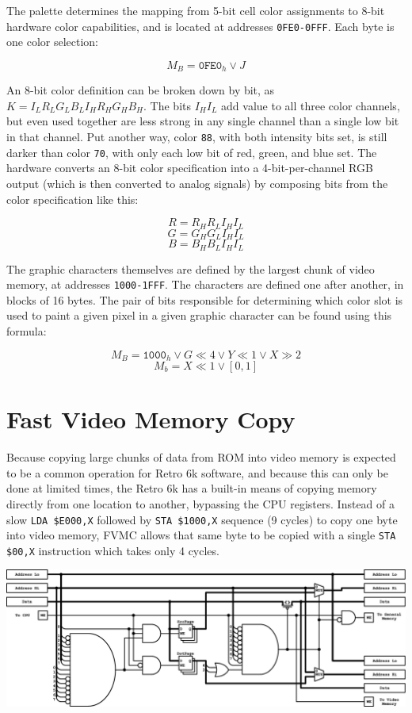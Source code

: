 \documentclass[12pt]{{memoir}}
\begin{document}
The palette determines the mapping from 5-bit cell color assignments to 8-bit hardware color capabilities, and is located at addresses \texttt{0FE0-0FFF}. Each byte is one color selection:

$$M_B = \texttt{0FE0}_h \vee J$$

An 8-bit color definition can be broken down by bit, as $K = I_LR_LG_LB_LI_HR_HG_HB_H$. The bits $I_HI_L$ add value to all three color channels, but even used together are less strong in any single channel than a single low bit in that channel. Put another way, color \texttt{88}, with both intensity bits set, is still darker than color \texttt{70}, with only each low bit of red, green, and blue set. The hardware converts an 8-bit color specification into a 4-bit-per-channel RGB output (which is then converted to analog signals) by composing bits from the color specification like this:

$$R = R_HR_LI_HI_L$$
$$G = G_HG_LI_HI_L$$
$$B = B_HB_LI_HI_L$$

The graphic characters themselves are defined by the largest chunk of video memory, at addresses \texttt{1000-1FFF}. The characters are defined one after another, in blocks of 16 bytes. The pair of bits responsible for determining which color slot is used to paint a given pixel in a given graphic character can be found using this formula:

$$M_B = \texttt{1000}_h \vee G \ll 4 \vee Y \ll 1 \vee X \gg 2$$
$$M_b = X \ll 1 \vee [0,1]$$

\section{Fast Video Memory Copy}
\label{sec:fvmc}

Because copying large chunks of data from ROM into video memory is expected to be a common operation for Retro 6k software, and because this can only be done at limited times, the Retro 6k has a built-in means of copying memory directly from one location to another, bypassing the CPU registers. Instead of a slow \texttt{LDA \$E000,X} followed by \texttt{STA \$1000,X} sequence (9 cycles) to copy one byte into video memory, FVMC allows that same byte to be copied with a single \texttt{STA \$00,X} instruction which takes only 4 cycles.

\begin{center}\includegraphics[width=\textwidth]{fvmc}\end{center}
\end{document}
